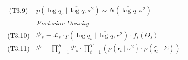 \documentclass[]{scrartcl}
\begin{document}
\begin{table}[htbp]
\begin{center}
\begin{tabular}{cl}
(T3.9) & $p \left( \log q_s ~|~ \overline{\log q}, \kappa^2 \right) \sim N \left( \overline{\log q}, \kappa^2 \right)$ \\
& \textit{ Posterior Density } \\
(T3.10) & $\mathcal{P}_s = \mathcal{L}_s \cdot p \left( \log q_s ~|~ \overline{\log q}, \kappa^2 \right) \cdot f_s(\Theta_s)$ \\
(T3.11) & $\mathcal{P} = \prod_{s = 1}^S \mathcal{P}_s \cdot
            \prod_{t = 1}^T \left( p \left( \epsilon_{t} ~|~ \sigma^2 \right) \cdot p \left( \zeta_{t} ~|~ \Sigma \right) \right ) 
             $ \\
\hline
\end{tabular}
\end{center}
\end{table}

\newpage
\end{document}
